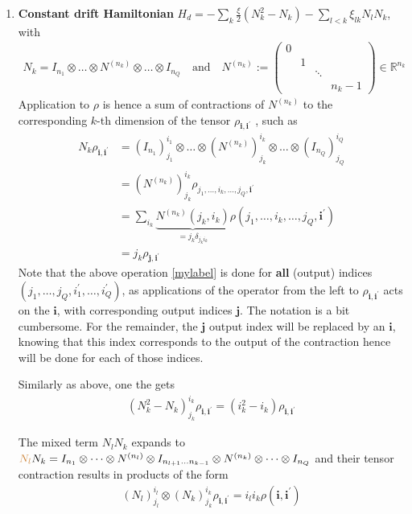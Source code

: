 \documentclass[letterpaper]{article}
\newcommand{\R}{\mathds{R}}
\newcommand{\bfi}{\boldsymbol{i}}
\newcommand{\bfj}{\boldsymbol{j}}
\newcommand{\p}{\prime}
\newcommand{\YC}[1]{{\textcolor{Bronze}{#1}}}
\begin{document}
\begin{enumerate}
    \item \textbf{Constant drift Hamiltonian} $H_d = -\sum_k \frac{\xi}{2}
      \left(N_k^2 - N_k\right) - \sum_{l<k} \xi_{lk} N_lN_k$, with
      \begin{align}
      N_k = I_{n_1}\otimes \dots \otimes N^{(n_k)} \otimes \dots \otimes I_{n_Q}
        \quad \text{and} \quad N^{(n_k)} := \begin{pmatrix} 0 & & \\ & 1& \\ & &
        \ddots \\ & & & n_k -1\end{pmatrix} \in \R^{n_k}
      \end{align}
      Application to $\rho$ is hence a sum of contractions of $N^{(n_k)}$ to the
      corresponding $k$-th dimension of the tensor $\rho_{\bfi, \bfi^\p}$ , such
      as
      \begin{align}
        N_k \rho_{\bfi, \bfi^\p} &=  \left(I_{n_1}\right)^{i_1}_{j_1}\otimes
        \dots \otimes \left(N^{(n_k)}\right)^{i_k}_{j_k} \otimes \dots \otimes
        \left(I_{n_Q}\right)^{i_Q}_{j_Q} \label{mylabel} \\ 
        &= \left(N^{(n_k)}\right)_{j_k}^{i_k} \rho_{j_1,\dots, i_k, \dots, j_Q,
        \bfi^\p} \\
        &= \sum_{i_k} \underbrace{N^{(n_k)}(j_k, i_k)}_{ = j_k\delta_{j_ki_k} }
        \rho(j_1,\dots, i_k,\dots, j_Q, \bfi^\p) \\
        &= j_k \rho_{\bfj, \bfi^\p}
      \end{align}
      Note that the above operation \eqref{mylabel} is done for \textbf{all}
      (output) indices $(j_1, \dots, j_Q, i_1^\p,\dots,i_Q^\p)$, as applications
      of the operator from the left to $\rho_{\bfi, \bfi^\p}$ acts on the
      $\bfi$, with corresponding output indices $\bfj$. The notation is a bit
      cumbersome. For the \YC{remainder}, the $\bfj$ output index will be
      replaced by an $\bfi$, knowing that this index corresponds to the output
      of the contraction hence will be done for each of those indices. 

      Similarly as above, one the gets
      \begin{align}
        \left(N_k^2-N_k\right)_{j_k}^{i_k} \rho_{\bfi, \bfi^\p} = \left(i_k^2 -
        i_k\right) \rho_{\bfi,\bfi^\prime}
      \end{align}

      The mixed term $N_lN_k$ expands to $\YC{N_l}N_k = I_{n_1}\otimes \dots
      \otimes N^{(n_l)} \otimes I_{n_{l+1} \dots n_{k-1}}\otimes N^{(n_k)}
      \otimes \dots \otimes I_{n_Q}$ and their tensor contraction results in
      products of the form 
      \begin{align}
        (N_l)^{i_l}_{j_l} \otimes (N_k)_{j_k}^{i_k} \rho_{\bfi, \bfi^\p} =
        i_li_k\rho(\bfi, \bfi^\prime)
      \end{align}


\end{enumerate}
\end{document}
